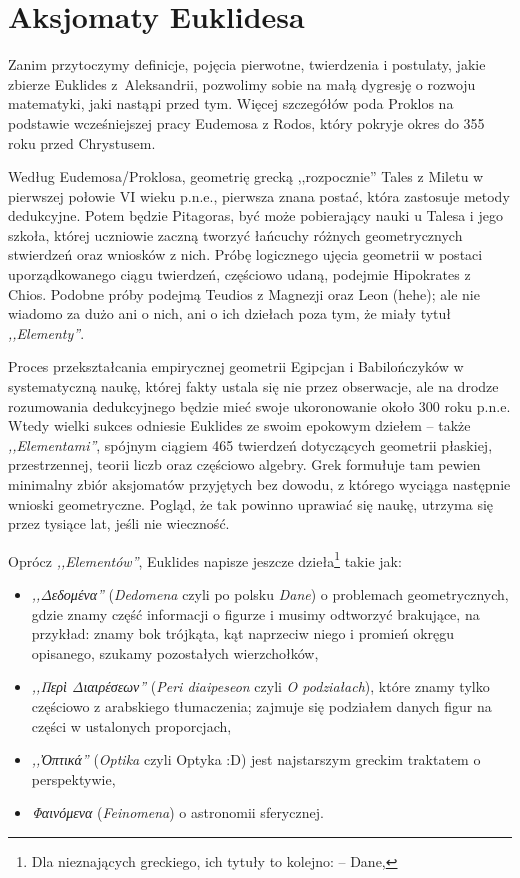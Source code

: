 %

\section{Aksjomaty Euklidesa}

Zanim przytoczymy definicje, pojęcia pierwotne, twierdzenia i postulaty, jakie zbierze Euklides z~Aleksandrii, pozwolimy sobie na małą dygresję o rozwoju matematyki, jaki nastąpi przed tym.
Więcej szczegółów poda Proklos na podstawie wcześniejszej pracy Eudemosa z Rodos, który pokryje okres do 355 roku przed Chrystusem.
%
%

Według Eudemosa/Proklosa, geometrię grecką ,,rozpocznie'' Tales z Miletu w pierwszej połowie VI wieku p.n.e., pierwsza znana postać, która zastosuje metody dedukcyjne.
%
Potem będzie Pitagoras, być może pobierający nauki u Talesa i jego szkoła, której uczniowie zaczną tworzyć łańcuchy różnych geometrycznych stwierdzeń oraz wniosków z nich. 
%
Próbę logicznego ujęcia geometrii w postaci uporządkowanego ciągu twierdzeń, częściowo udaną, podejmie Hipokrates z Chios.
%
Podobne próby podejmą Teudios z Magnezji oraz Leon (hehe); ale nie wiadomo za dużo ani o nich, ani o ich dziełach poza tym, że miały tytuł \emph{,,Elementy''}.
%
%

Proces przekształcania empirycznej geometrii Egipcjan i Babilończyków w systematyczną naukę, której fakty ustala się nie przez obserwacje, ale na drodze rozumowania dedukcyjnego będzie mieć swoje ukoronowanie około 300 roku p.n.e.
Wtedy wielki sukces odniesie Euklides ze swoim epokowym dziełem -- także \emph{,,Elementami''}, spójnym ciągiem 465 twierdzeń dotyczących geometrii płaskiej, przestrzennej, teorii liczb oraz częściowo algebry.
Grek formułuje tam pewien minimalny zbiór aksjomatów przyjętych bez dowodu, z którego wyciąga następnie wnioski geometryczne.
Pogląd, że tak powinno uprawiać się naukę, utrzyma się przez tysiące lat, jeśli nie wieczność.

Oprócz \emph{,,Elementów''}, Euklides napisze jeszcze dzieła\footnote{Dla nieznających greckiego, ich tytuły to kolejno:  -- Dane,} takie jak:
\begin{itemize}
    \item \emph{,,Δεδομένα''} (\emph{Dedomena} czyli po polsku \emph{Dane}) o problemach geometrycznych, gdzie znamy część informacji o figurze i musimy odtworzyć brakujące, na przykład: znamy bok trójkąta, kąt naprzeciw niego i promień okręgu opisanego, szukamy pozostałych wierzchołków,
    \item \emph{,,Περὶ Διαιρέσεων''} (\emph{Peri diaipeseon} czyli \emph{O podziałach}), które znamy tylko częściowo z arabskiego tłumaczenia; zajmuje się podziałem danych figur na części w ustalonych proporcjach,
    \item \emph{,,Ὀπτικά''} (\emph{Optika} czyli Optyka :D) jest najstarszym greckim traktatem o perspektywie,
    \item \emph{Φαινόμενα} (\emph{Feinomena}) o astronomii sferycznej.
\end{itemize}

